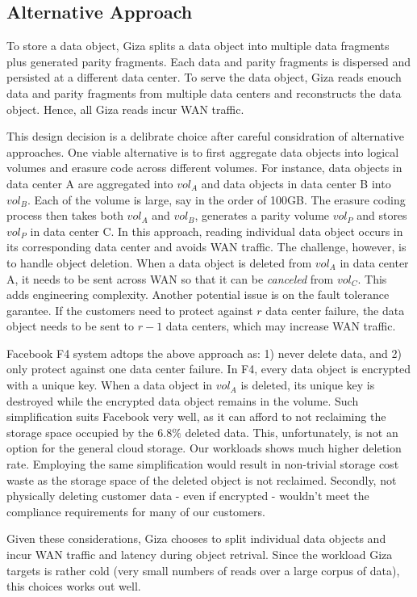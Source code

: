 \subsection{Alternative Approach}

To store a data object, Giza splits a data object into multiple data fragments plus generated parity fragments. Each data and parity fragments is dispersed and persisted at a different data center. To serve the data object, Giza reads enouch data and parity fragments from multiple data centers and reconstructs the data object. Hence, all Giza reads incur WAN traffic.

This design decision is a delibrate choice after careful considration of alternative approaches. One viable alternative is to first aggregate data objects into logical volumes and erasure code across different volumes. For instance, data objects in data center A are aggregated into $vol_A$ and data objects in data center B into $vol_B$. Each of the volume is large, say in the order of 100GB. The erasure coding process then takes both $vol_A$ and $vol_B$,  generates a parity volume $vol_P$ and stores $vol_P$ in data center C. In this approach, reading individual data object occurs in its corresponding data center and avoids WAN traffic. The challenge, however, is to handle object deletion. When a data object is deleted from $vol_A$ in data center A, it needs to be sent across WAN so that it can be {\em canceled} from $vol_C$. This adds engineering complexity. Another potential issue is on the fault tolerance garantee. If the customers need to protect against $r$ data center failure, the data object needs to be sent to $r-1$ data centers, which may increase WAN traffic.  

Facebook F4 system adtops the above approach as: 1) never delete data, and 2) only protect against one data center failure. In F4, every data object is encrypted with a unique key. When a data object in $vol_A$ is deleted, its unique key is destroyed while the encrypted data object remains in the volume. Such simplification suits Facebook very well, as it can afford to not reclaiming the storage space occupied by the  $6.8\%$ deleted data. This, unfortunately, is not an option for the general cloud storage. Our workloads shows much higher deletion rate. Employing the same simplification would result in non-trivial storage cost waste as the storage space of the deleted object is not reclaimed. Secondly, not physically deleting customer data - even if encrypted - wouldn't meet the compliance requirements for many of our customers.

Given these considerations, Giza chooses to split individual data objects and incur WAN traffic and latency during object retrival. Since the workload Giza targets is rather cold (very small numbers of reads over a large corpus of data), this choices works out well.

